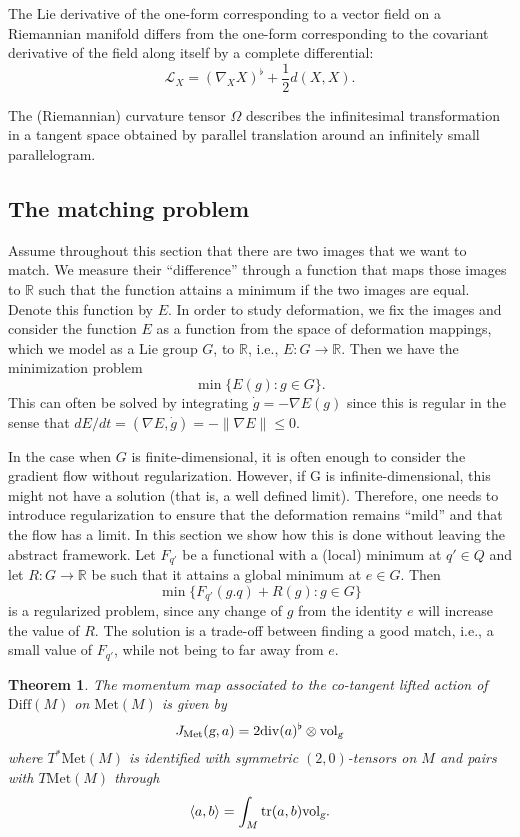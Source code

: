 \documentclass{article}
\theoremstyle{plain}
\newtheorem{teo}{Theorem}[section]
\theoremstyle{definition}
\newcommand{\R}{\ensuremath{\mathbb{R}}}
\newcommand{\g}{\ensuremath{\textsl{g}}}
\newcommand{\Diff}{\ensuremath{\mathrm{Diff}}}
\newcommand{\Met}{\ensuremath{\mathrm{Met}}}
\newcommand{\Div}{\ensuremath{\mathrm{div}}}
\newcommand{\Vol}{\ensuremath{\mathrm{vol}}}
\newcommand{\lie}{\ensuremath{\mathcal{L}}}
\newcommand{\tr}{\ensuremath{\mathrm{tr}}}
\begin{document}
The Lie derivative of the one-form corresponding to a vector
field on a Riemannian manifold differs from the one-form corresponding to the
covariant derivative of the field along itself by a complete differential:
\[
\lie_X=(\nabla_X X)^\flat +\frac{1}{2}d(X,X).
\]

The (Riemannian) curvature tensor $\Omega$ describes the infinitesimal
transformation in a tangent space obtained by parallel translation around an
infinitely small parallelogram.

\subsection{The matching problem}
Assume throughout this section that there are two images that we want to match. We measure their ``difference'' through a function that maps those images to $\R$ such that the function attains a minimum if the two images are equal. Denote this function by $E$. In order to study deformation, we fix the images and consider the function $E$ as a function from the space of deformation mappings, which we model as a Lie group $G$, to $\R$, i.e., $E:G\to \R$. Then we have the minimization problem
\[
\min \{E(g):g\in G\}.
\]
This can often be solved by integrating $\dot{g}=-\nabla E(g)$ since this is regular in the sense that $dE/dt=(\nabla E,\dot{g})=-\|\nabla E\|\leq 0$.

In the case when $G$ is finite-dimensional, it is often enough to consider the
gradient flow without regularization. However, if G is infinite-dimensional, this might
not have a solution (that is, a well defined limit). Therefore, one needs to introduce
regularization to ensure that the deformation remains ``mild'' and that the 
flow
has a limit. In this section we show how this is done without leaving the abstract
framework. Let $F_{q'}$ be a functional with a (local) minimum at $q'\in Q$ and let $R:G\to \R$ be such that it attains a global minimum at $e\in G$. Then
\[
\min \{F_{q'}(g.q)+R(g):g\in G\}
\]
is a regularized problem, since any change of $g$ from the identity $e$ will increase the value of $R$. The solution is a trade-off between finding a good match, i.e., a small value of $F_{q'}$, while not being to far away from $e$.






\begin{teo}
	The momentum map associated to  the co-tangent lifted action  of $\Diff(M)$ on $\Met(M)$ is given by
	\[
	  J_\Met(\g,a)=2\Div (a)^\flat \otimes \Vol_\g  
	\]
	where $T^*\Met(M)$ is identified with  symmetric $(2,0)$-tensors on $M$ and  pairs with $T\Met(M)$ through
	\[
	\langle a,b\rangle = \int_M \tr (a,b)\Vol_\g.
	\]
\end{teo}
\end{document}
